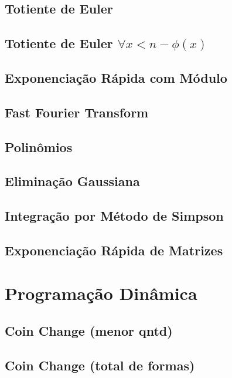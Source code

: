 \documentclass[10pt, letterpaper, twocolumn, twosides]{article}
\begin{document}
\subsection{Totiente de Euler}

\subsection{Totiente de Euler ${\forall x < n - \phi(x)}$}

\subsection{Exponenciação Rápida com Módulo}

\subsection{Fast Fourier Transform}

\subsection{Polinômios}

\subsection{Eliminação Gaussiana}

\subsection{Integração por Método de Simpson}

\subsection{Exponenciação Rápida de Matrizes}


\section{Programação Dinâmica}
\subsection{Coin Change (menor qntd)}

\subsection{Coin Change (total de formas)}

\end{document}
